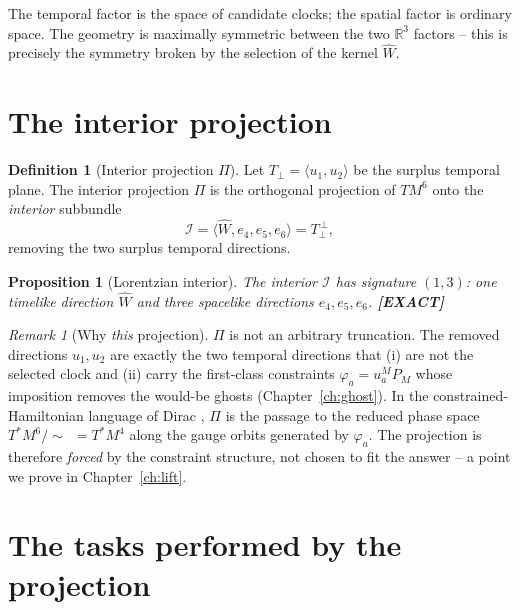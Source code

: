 \documentclass[11pt,oneside]{book}
\newcommand{\Wh}{\hat{W}}                         %
\newcommand{\RR}{\mathbb{R}}
\newcommand{\status}[1]{{\sffamily\bfseries\color{statuscol}[#1]}}
\theoremstyle{plain}
\newtheorem{proposition}[theorem]{Proposition}
\theoremstyle{definition}
\newtheorem{definition}[theorem]{Definition}
\theoremstyle{remark}
\newtheorem{remark}[theorem]{Remark}
\begin{document}
The temporal factor is the space of candidate clocks; the spatial factor is
ordinary space. The geometry is maximally symmetric between the two $\RR^3$
factors -- this is precisely the symmetry broken by the selection of the kernel
$\Wh$.

\section{The interior projection}
\label{sec:projection}

\begin{definition}[Interior projection $\Pi$]
\label{def:Pi}
Let $T_\perp=\langle u_1,u_2\rangle$ be the surplus temporal plane. The interior
projection $\Pi$ is the orthogonal projection of $T M^6$ onto the
\emph{interior} subbundle
\[
  \mathcal I=\langle \Wh, e_4,e_5,e_6\rangle = T_\perp^{\,\perp},
\]
removing the two surplus temporal directions.
\end{definition}

\begin{proposition}[Lorentzian interior]
\label{prop:interior-sig}
The interior $\mathcal I$ has signature $(1,3)$: one timelike direction $\Wh$ and
three spacelike directions $e_4,e_5,e_6$. \status{EXACT}
\end{proposition}

\begin{remark}[Why \emph{this} projection]
$\Pi$ is not an arbitrary truncation. The removed directions $u_1,u_2$ are exactly
the two temporal directions that (i) are not the selected clock and (ii) carry the
first-class constraints $\varphi_a=u_a^MP_M$ whose imposition removes the would-be
ghosts (Chapter~\ref{ch:ghost}). In the constrained-Hamiltonian language of Dirac
\cite{DiracLectures1964,HenneauxTeitelboim1992}, $\Pi$ is the passage to the reduced
phase space $T^*M^6/\!\sim\;\,=T^*M^4$ along the gauge orbits generated by
$\varphi_a$. The projection is therefore \emph{forced} by the constraint structure,
not chosen to fit the answer -- a point we prove in Chapter~\ref{ch:lift}.
\end{remark}

\section{The tasks performed by the projection}
\label{sec:six-jobs}
\end{document}

